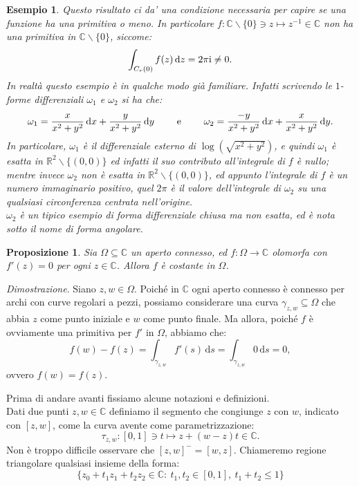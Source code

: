 \documentclass[11pt]{book}
\makeatletter
\theoremstyle{Definizione}
\theoremstyle{TeoremaProposizioneLemmaCorollarioCongettura}
\newtheorem{mypropo}[myteo]{Proposizione}
\theoremstyle{OsservazioneNotaEsempio}
\newtheorem{myes}{Esempio}[section]
\renewenvironment{proof}[1][\proofname]{\par
  \normalfont \topsep6\p@\@plus6\p@\relax
  \trivlist
  \item[\hskip\labelsep
        \itshape
    #1\@addpunct{.}]\ignorespaces
}{%
  \endtrivlist\@endpefalse
}
\renewenvironment{proof}{\textsl{Dimostrazione}.}{}
\newcommand{\R}{\mathbb{R}}
\newcommand{\C}{\mathbb{C}}
\newcommand{\tolto}{\smallsetminus}
\renewcommand{\i}{\textup{i}}
\renewcommand{\d}{\mathrm{d}}
\newcommand{\dz}{\,\d z}
\newcommand{\ds}{\,\d s}
\newcommand{\dx}{\,\d x}
\newcommand{\dy}{\,\d y}
\makeatother
\begin{document}
\begin{myes}
Questo risultato ci da' una condizione necessaria per capire se una funzione ha una primitiva o meno. In particolare $f:\C\tolto\{0\} \ni z \longmapsto z^{-1}\in \C$ non ha una primitiva in $\C\tolto\{0\}$, siccome:
$$
\int_{C_r(0)} f(z)\dz = 2\pi\i\neq 0.
$$
In realtà questo esempio è in qualche modo già familiare. Infatti scrivendo le $1$-forme differenziali $\omega_1$ e $\omega_2$ si ha che:
$$
\omega_1 = \frac{x}{x^2+y^2}\dx + \frac{y}{x^2+y^2}\dy \qquad \textup{ e }\qquad\omega_2 = \frac{-y}{x^2+y^2}\dx + \frac{x}{x^2+y^2}\dy.
$$
In particolare, $\omega_1$ è il differenziale esterno di $\log(\sqrt{x^2+y^2})$, e quindi $\omega_1$ è esatta in $\R^2 \tolto \{(0,0)\}$ ed infatti il suo contributo all'integrale di $f$ è nullo; mentre invece $\omega_2$ non è esatta in $\R^2\tolto\{(0,0)\}$, ed appunto l'integrale di $f$ è un numero immaginario positivo, quel $2\pi$ è il valore dell'integrale di $\omega_2$ su una qualsiasi circonferenza centrata nell'origine.\\
$\omega_2$ è un tipico esempio di forma differenziale chiusa ma non esatta, ed è nota sotto il nome di \textsl{forma angolare}.
\end{myes}
\begin{boxpro}
\begin{mypropo}
Sia $\Omega\subseteq \C$ un aperto connesso, ed $f:\Omega \longrightarrow \C$ olomorfa con $f'(z) = 0$ per ogni $z\in \C$. Allora $f$ è costante in $\Omega$.
\end{mypropo}
\tcblower
\begin{proof}
Siano $z,w\in \Omega$. Poiché in $\C$ ogni aperto connesso è connesso per archi con curve regolari a pezzi, possiamo considerare una curva $\gamma_{z,w}\subseteq \Omega$ che abbia $z$ come punto iniziale e $w$ come punto finale. Ma allora, poiché $f$ è ovviamente una primitiva per $f'$ in $\Omega$, abbiamo che:
$$
f(w)-f(z) = \int_{\gamma_{z,w}} f'(s)\ds = \int_{\gamma_{z,w}} 0 \ds = 0,
$$
ovvero $f(w) = f(z)$.
\end{proof}
\end{boxpro}
\noindent
Prima di andare avanti fissiamo alcune notazioni e definizioni.\\
Dati due punti $z,w\in \C$ definiamo il segmento che congiunge $z$ con $w$, indicato con $[z,w]$, come la curva avente come parametrizzazione:
$$
\tau_{z,w}:[0,1]\ni t \longmapsto z+(w-z)t\in \C.
$$
Non è troppo difficile osservare che $[z,w]^- = [w,z]$. Chiameremo regione triangolare qualsiasi insieme della forma:
$$
\{z_0+t_1z_1+t_2z_2\in \C:\ t_1,t_2\in [0,1],\ t_1+t_2 \leq 1\}
$$
\end{document}
